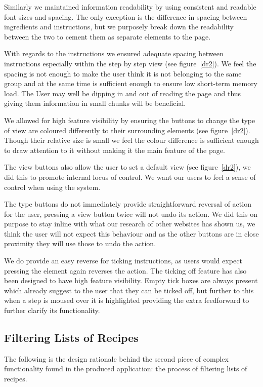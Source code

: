 Similarly we maintained information readability by using consistent and readable font sizes and spacing. The only exception is the difference in spacing between ingredients and instructions, but we purposely break down the readability between the two to cement them as separate elements to the page.

With regards to the instructions we ensured adequate spacing between instructions especially within the step by step view (see figure~\ref{dr2}). We feel the spacing is not enough to make the user think it is not belonging to the same group and at the same time is sufficient enough to ensure low short-term memory load. The User may well be dipping in and out of reading the page and thus giving them information in small chunks will be beneficial.

We allowed for high feature visibility by ensuring the buttons to change the type of view are coloured differently to their surrounding elements (see figure~\ref{dr2}). Though their relative size is small we feel the colour difference is sufficient enough to draw attention to it without making it the main feature of the page.

The view buttons also allow the user to set a default view (see figure~\ref{dr2}), we did this to promote internal locus of control. We want our users to feel a sense of control when using the system.

The type buttons do not immediately provide straightforward reversal of action for the user, pressing a view button twice will not undo its action. We did this on purpose to stay inline with what our research of other websites has shown us, we think the user will not expect this behaviour and as the other buttons are in close proximity they will use those to undo the action.

We do provide an easy reverse for ticking instructions, as users would expect pressing the element again reverses the action. The ticking off feature has also been designed to have high feature visibility. Empty tick boxes are always present which already suggest to the user that they can be ticked off, but further to this when a step is moused over it is highlighted providing the extra feedforward to further clarify its functionality.

\subsection{Filtering Lists of Recipes}
The following is the design rationale behind the second piece of complex functionality found in the produced application: the process of filtering lists of recipes.

